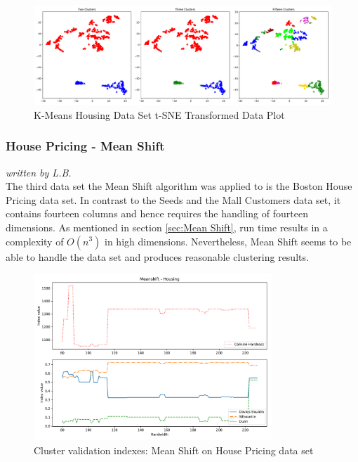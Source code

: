 \begin{figure}[H]
\begin{center}
\includegraphics[width=1.0\textwidth]{images/kmeans_housing_tsne.pdf}
\end{center}
\caption{K-Means Housing Data Set t-SNE Transformed Data Plot}
\label{fig:kmeans_housing_2d_comparison}
\end{figure}
\vspace{-0.5cm}

\subsubsection{House Pricing - Mean Shift}
\textit{written by L.B.}\\

The third data set the Mean Shift algorithm was applied to is the Boston House Pricing data set. In contrast to the Seeds and the Mall Customers data set, it contains fourteen columns and hence requires the handling of fourteen dimensions. As mentioned in section \ref{sec:Mean Shift}, run time results in a complexity of $O(n^{3})$ in high dimensions. 
Nevertheless, Mean Shift seems to be able to handle the data set and produces reasonable clustering results. 

\begin{figure}[H]
\begin{center}
\includegraphics[width=0.8\textwidth]{images/Meanshift_-_Housing.pdf}
\end{center}
\caption{Cluster validation indexes: Mean Shift on House Pricing data set}
\label{fig:meanshift_housing_indexes}
\end{figure}

